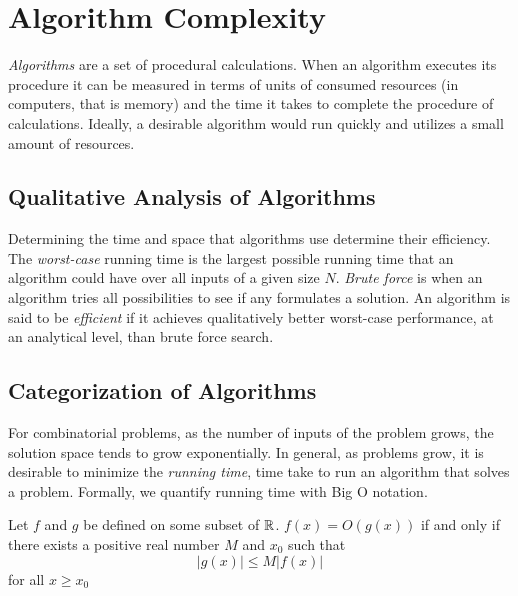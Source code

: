 \section{Algorithm Complexity}
\textit{Algorithms} are a set of procedural calculations.  When an algorithm executes its procedure it can be measured in terms of units of consumed resources (in computers, that is memory) and the time it takes to complete the procedure of calculations.  Ideally, a desirable algorithm would run quickly and utilizes a small amount of resources.

\subsection{Qualitative Analysis of Algorithms  }
Determining the time and space that algorithms use determine their efficiency.  The \textit{worst-case} running time is the largest possible running time that an algorithm could have over all inputs of a given size $N$.  \textit{Brute force} is when an algorithm tries all possibilities to see if any formulates a solution.  An algorithm is said to be \textit{efficient} if it achieves qualitatively better worst-case performance, at an analytical level, than brute force search.%

\subsection{Categorization of Algorithms}
For combinatorial problems, as the number of inputs of the problem grows, the solution space tends to grow exponentially.  In general, as problems grow, it is desirable to minimize the \textit{running time}, time take to run an algorithm that solves a problem. Formally, we quantify running time with Big O notation.
\begin{definition}
Let $f$ and $g$ be defined on some subset of ${\mathbb{R}}$.  $f(x) = O\left(g(x)\right)$ if and only if there exists a positive real number $M$ and $x_0$ such that $$\left\vert g(x)\right\vert \leq M \left\vert f(x) \right\vert$$
for all $x \geq x_0$
\end{definition}



